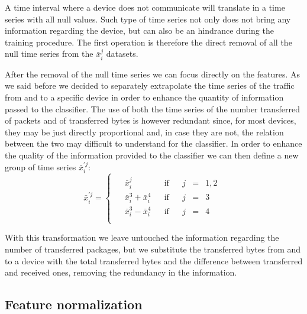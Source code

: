 A time interval where a device does not communicate will translate in a time series with all null values. Such type of time series not only does not bring any information regarding the device, but can also be an hindrance during the training procedure. The first operation is therefore the direct removal of all the null time series from the $\bar{x}_i^j$ datasets.

After the removal of the null time series we can focus directly on the features. As we said before we decided to separately extrapolate the time series of the traffic from and to a specific device in order to enhance the quantity of information passed to the classifier. The use of both the time series of the number transferred of packets and of transferred bytes is however redundant since, for most devices, they may be just directly proportional and, in case they are not, the relation between the two may difficult to understand for the classifier.
In order to enhance the quality of the information provided to the classifier we can then define a new group of time series $\bar{x}^{\prime j}_i$:
\begin{equation}
    \bar{x}^{\prime j}_i = 
    \begin{cases}
    \begin{aligned}
    & \bar{x}_i^j               &&\text{if}&& j&=&1,2 \\
    & \bar{x}_i^3 + \bar{x}_i^4 &&\text{if}&& j&=&3 \\
    & \bar{x}_i^3 - \bar{x}_i^4 &&\text{if}&& j&=&4 \\
    \end{aligned}
    \end{cases}
\end{equation}

With this transformation we leave untouched the information regarding the number of transferred packages, but we substitute the transferred bytes from and to a device with the total transferred bytes and the difference between transferred and received ones, removing the redundancy in the information.

\subsection{Feature normalization}

